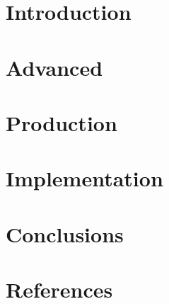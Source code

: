 \section[Intro]{Introduction}


\section[Adv]{Advanced}


\section[Prod]{Production}


\section[Impl]{Implementation}


\section[Concl]{Conclusions}


\section[Refs]{References}
